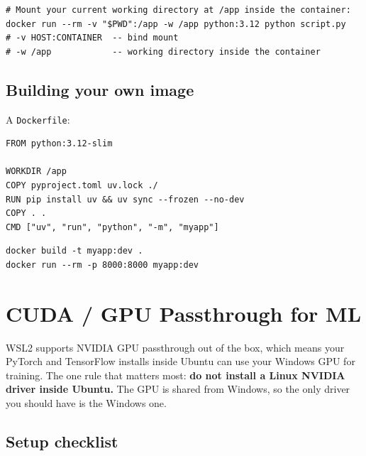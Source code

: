 \documentclass[11pt,a4paper]{article}
\begin{document}
\begin{lstlisting}[style=bashstyle]
# Mount your current working directory at /app inside the container:
docker run --rm -v "$PWD":/app -w /app python:3.12 python script.py
# -v HOST:CONTAINER  -- bind mount
# -w /app            -- working directory inside the container
\end{lstlisting}

\subsection*{Building your own image}

A \texttt{Dockerfile}:

\begin{lstlisting}[style=bashstyle]
FROM python:3.12-slim

WORKDIR /app
COPY pyproject.toml uv.lock ./
RUN pip install uv && uv sync --frozen --no-dev
COPY . .
CMD ["uv", "run", "python", "-m", "myapp"]
\end{lstlisting}

\begin{lstlisting}[style=bashstyle]
docker build -t myapp:dev .
docker run --rm -p 8000:8000 myapp:dev
\end{lstlisting}

\section{CUDA / GPU Passthrough for ML}

WSL2 supports NVIDIA GPU passthrough out of the box, which means
your PyTorch and TensorFlow installs inside Ubuntu can use your
Windows GPU for training. The one rule that matters most: \textbf{do
not install a Linux NVIDIA driver inside Ubuntu.} The GPU is
shared from Windows, so the only driver you should have is the
Windows one.

\subsection*{Setup checklist}
\end{document}
